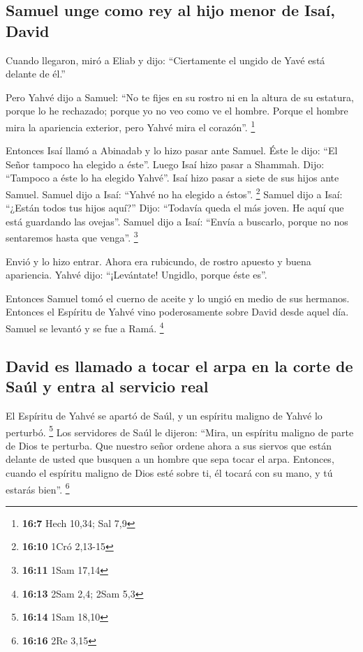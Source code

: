 \begin{paracol}{2}
\hypertarget{samuel-unge-como-rey-al-hijo-menor-de-isauxed-david}{%
\subsection{Samuel unge como rey al hijo menor de Isaí,
David}\label{samuel-unge-como-rey-al-hijo-menor-de-isauxed-david}}

 Cuando llegaron, miró a Eliab y dijo: ``Ciertamente el
ungido de Yavé está delante de él.''

 Pero Yahvé dijo a Samuel: ``No te fijes en su rostro ni
en la altura de su estatura, porque lo he rechazado; porque yo no veo
como ve el hombre. Porque el hombre mira la apariencia exterior, pero
Yahvé mira el corazón''. \footnote{\textbf{16:7} Hech 10,34; Sal 7,9}

 Entonces Isaí llamó a Abinadab y lo hizo pasar ante
Samuel. Éste le dijo: ``El Señor tampoco ha elegido a éste''.
 Luego Isaí hizo pasar a Shammah. Dijo: ``Tampoco a éste
lo ha elegido Yahvé''.  Isaí hizo pasar a siete de sus
hijos ante Samuel. Samuel dijo a Isaí: ``Yahvé no ha elegido a éstos''.
\footnote{\textbf{16:10} 1Cró 2,13-15}  Samuel dijo a
Isaí: ``¿Están todos tus hijos aquí?'' Dijo: ``Todavía queda el más
joven. He aquí que está guardando las ovejas''. Samuel dijo a Isaí:
``Envía a buscarlo, porque no nos sentaremos hasta que venga''.
\footnote{\textbf{16:11} 1Sam 17,14}

 Envió y lo hizo entrar. Ahora era rubicundo, de rostro
apuesto y buena apariencia. Yahvé dijo: ``¡Levántate! Ungidlo, porque
éste es''.

 Entonces Samuel tomó el cuerno de aceite y lo ungió en
medio de sus hermanos. Entonces el Espíritu de Yahvé vino poderosamente
sobre David desde aquel día. Samuel se levantó y se fue a Ramá.
\footnote{\textbf{16:13} 2Sam 2,4; 2Sam 5,3}

\hypertarget{david-es-llamado-a-tocar-el-arpa-en-la-corte-de-sauxfal-y-entra-al-servicio-real}{%
\subsection{David es llamado a tocar el arpa en la corte de Saúl y entra
al servicio
real}\label{david-es-llamado-a-tocar-el-arpa-en-la-corte-de-sauxfal-y-entra-al-servicio-real}}

 El Espíritu de Yahvé se apartó de Saúl, y un espíritu
maligno de Yahvé lo perturbó. \footnote{\textbf{16:14} 1Sam 18,10}
 Los servidores de Saúl le dijeron: ``Mira, un espíritu
maligno de parte de Dios te perturba.  Que nuestro señor
ordene ahora a sus siervos que están delante de usted que busquen a un
hombre que sepa tocar el arpa. Entonces, cuando el espíritu maligno de
Dios esté sobre ti, él tocará con su mano, y tú estarás bien''.
\footnote{\textbf{16:16} 2Re 3,15}


\end{paracol}
